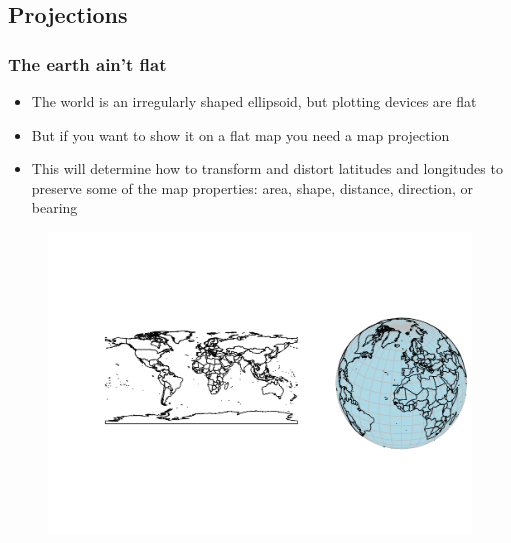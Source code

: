 \documentclass[
  shownotes,
  xcolor={svgnames},
  hyperref={colorlinks,citecolor=DarkBlue,linkcolor=DarkRed,urlcolor=DarkBlue}
   , aspectratio=169]{beamer}
\begin{document}
\subsection{Projections}
\begin{frame}[fragile]
\frametitle{The earth ain't flat}
\begin{itemize}
	\footnotesize
	\item The world is an irregularly shaped ellipsoid, but plotting devices are flat
	\medskip
	\item But if you want to show it on a flat map you need a map projection
	\medskip
	\item This  will determine how to transform and distort latitudes and longitudes to preserve some of the map properties: area, shape, distance, direction, or bearing
\end{itemize}

\begin{figure}[H] \centering
            \captionsetup{justification=centering}
				\includegraphics[scale=0.6]{figures/world-1.png}
 \end{figure}

\end{frame}
\end{document}
